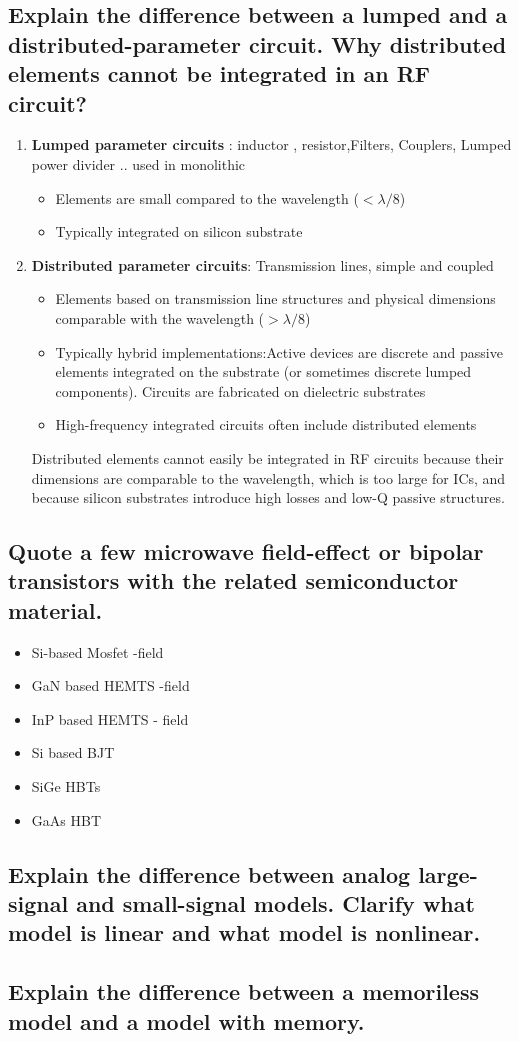 \subsection{Explain the difference between a lumped and a distributed-parameter circuit. Why distributed
elements cannot be integrated in an RF circuit?}
\begin{enumerate}

\item \textbf{Lumped parameter circuits} : inductor , resistor,Filters, Couplers, Lumped power divider .. used in monolithic
\begin{itemize}
    \item Elements are small compared to the wavelength 
    ($< \lambda/8$)
    \item Typically integrated on silicon substrate 
\end{itemize}

\item \textbf{Distributed parameter circuits}: Transmission lines, simple and coupled
\begin{itemize}
    \item Elements based on transmission line structures and  physical dimensions comparable with the wavelength 
    ($> \lambda/8$)
    \item Typically hybrid implementations:Active devices are discrete and passive elements integrated on the substrate 
        (or sometimes discrete lumped components). Circuits are fabricated on dielectric substrates 
    \item High-frequency integrated circuits often include 
    distributed elements
\end{itemize}
Distributed elements cannot easily be integrated in RF circuits because their dimensions are comparable to the wavelength, 
which is too large for ICs, and because silicon substrates introduce high losses and low-Q passive structures.
\end{enumerate}

\subsection{Quote a few microwave field-effect or bipolar transistors with the related semiconductor
material.}
\begin{itemize}
    \item Si-based Mosfet -field
    \item GaN based HEMTS -field
    \item InP based HEMTS - field
    \item Si based BJT
    \item SiGe HBTs
    \item  GaAs HBT
\end{itemize}

\subsection{Explain the difference between analog large-signal and small-signal models. Clarify what
model is linear and what model is nonlinear.}

\subsection{Explain the difference between a memoriless model and a model with memory.}
